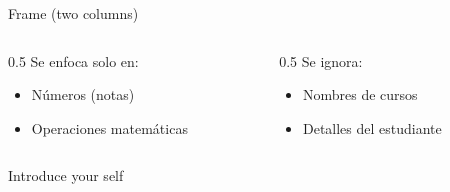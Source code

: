 \documentclass[aspectratio=169]{beamer}
\begin{document}
        \begin{frame}{Frame (two columns)}
            \begin{columns}[t] %
                \begin{column}{0.5\textwidth}
                    \hspace{0.2cm} Se enfoca solo en:
                    \begin{itemize}
                        \item Números (notas)
                        \item Operaciones matemáticas
                    \end{itemize}
                \end{column}
                
                \begin{column}{0.5\textwidth}
                    Se ignora:
                    \begin{itemize}
                        \item Nombres de cursos
                        \item Detalles del estudiante
                    \end{itemize}
                \end{column}
            \end{columns}

            \begin{note}
                {Introduce your self}
            \end{note}
        \end{frame}
\end{document}
